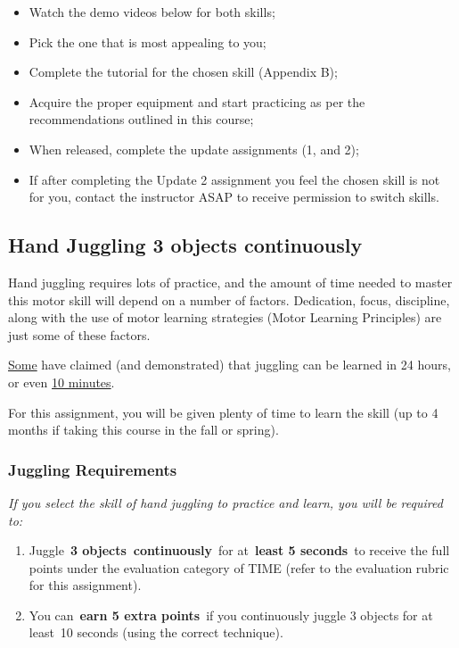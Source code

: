 \documentclass[
  letterpaper,
  DIV=11,
  numbers=noendperiod]{scrartcl}
\providecommand{\tightlist}{%
  \setlength{\itemsep}{0pt}\setlength{\parskip}{0pt}}\usepackage{longtable,booktabs,array}
\begin{document}
\begin{itemize}
\tightlist
\item
  Watch the demo videos below for both skills;
\item
  Pick the one that is most appealing to you;
\item
  Complete the tutorial for the chosen skill (Appendix B);
\item
  Acquire the proper equipment and start practicing as per the
  recommendations outlined in this course;
\item
  When released, complete the update assignments (1, and 2);
\item
  If after completing the Update 2 assignment you feel the chosen skill
  is not for you, contact the instructor ASAP to receive permission to
  switch skills.
\end{itemize}

\hypertarget{hand-juggling-3-objects-continuously}{%
\subsection{Hand Juggling 3 objects
continuously}\label{hand-juggling-3-objects-continuously}}

Hand juggling requires lots of practice, and the amount of time needed
to master this motor skill will depend on a number of factors.
Dedication, focus, discipline, along with the use of motor learning
strategies (Motor Learning Principles) are just some of these factors.

\href{https://youtu.be/EhMriDDA_Ag}{Some} have claimed (and
demonstrated) that juggling can be learned in 24 hours, or even
\href{https://youtu.be/JZmmOdnljG4}{10 minutes}.

For this assignment, you will be given plenty of time to learn the skill
(up to 4 months if taking this course in the fall or spring).

\hypertarget{juggling-requirements}{%
\subsubsection{Juggling Requirements}\label{juggling-requirements}}

\emph{If you select the skill of hand juggling to practice and learn,
you will be required to:}

\begin{enumerate}
\def\labelenumi{\arabic{enumi}.}
\item
  Juggle~\textbf{3 objects~continuously}~for at~\textbf{least 5
  seconds}~to receive the full points under the evaluation category of
  TIME (refer to the evaluation rubric for this assignment).~
\item
  You can~\textbf{earn 5 extra points}~if you continuously juggle 3
  objects for at least~10 seconds (using the correct technique).~
\end{enumerate}
\end{document}
